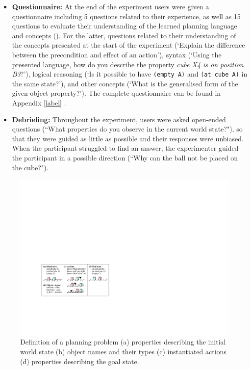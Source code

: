 \begin{itemize}
{This optional test allowed us to further verify their understanding of the planning concepts, in particular action preconditions and effects.}
  \item{\textbf{Questionnaire:} At the end of the experiment users were given a questionnaire including 5 questions related to their experience, as well as 15 questions to evaluate their understanding of the learned planning language and concepts ().
  For the latter, questions related to their understanding of the concepts presented at the start of the experiment (\eg `Explain the difference between the precondition and effect of an action'), syntax (\eg `Using the presented language, how do you describe the property \textit{cube X4 is on position B3}?'),
  logical reasoning 
  	(\eg `Is it possible to have \texttt{(empty A)} and \texttt{(at cube A)} in the same state?'), and other concepts (\eg `What is the generalised form of the given object property?').
  The complete questionnaire can be found in Appendix \ref{label} \todo.}
   \item {\textbf{Debriefing:} Throughout the experiment, users were asked open-ended questions (\eg ``What properties do you observe in the current world state?"), so that they were guided as little as possible and their responses were unbiased.
When the participant struggled to find an answer, the experimenter guided the participant in a possible direction (\eg ``Why can the ball not be placed on the cube?").} 
\end{itemize}

\begin{figure}[ht]
	\centering
	\includegraphics[width=0.7\linewidth]{figures/planning-permutation}
	\caption{Definition of a planning problem (a) properties describing the initial world state (b) object names and their types (c) instantiated actions (d) properties describing the goal state.}
	\label{fig:planning-permutation}
\end{figure}


